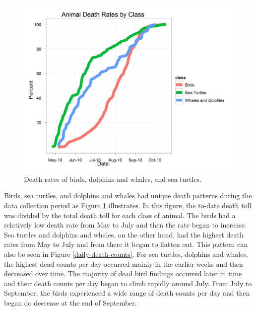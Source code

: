 \documentclass[11pt]{article}
\begin{document}
\begin{figure}[htbp] %
   \centering
   \includegraphics[width=5in]{death-rates.png} 
   \caption{Death rates of birds, dolphins and whales, and sea turtles. }
   \label{death rates}
\end{figure}

Birds, sea turtles, and dolphins and whales had unique death patterns during the data collection period as Figure \ref{death rates}  illustrates. In this figure, the to-date death toll was divided by the total death toll for each class of animal. The birds had a relatively low death rate from May to July and then the rate began to increase. Sea turtles and dolphins and whales, on the other hand, had the highest death rates from May to July and from there it began to flatten out. This pattern can also be seen in Figure \ref{daily-death-counts}. For sea turtles, dolphins and whales, the highest dead counts per day occurred mainly in the earlier weeks and then decreased over time.  The majority of dead bird findings occurred later in time and their death counts per day began to climb rapidly around July. From July to September, the birds experienced a wide range of death counts per day and then began do decrease at the end of September.   
\end{document}
